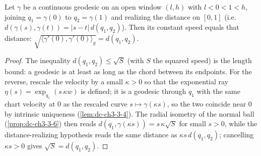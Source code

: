 \begin{lemma}
  \label{lem:dc-ch3-4-2-speed-dist}
  \leanok
  Let $\gamma$ be a continuous geodesic on an open window $(l,h)$ with $l<0<1<h$, joining
  $q_1=\gamma(0)$ to $q_2=\gamma(1)$ and realizing the distance on $[0,1]$
  (i.e. $d(\gamma(s),\gamma(t))=|s-t|\,d(q_1,q_2)$). Then its constant speed equals that distance:
  $\sqrt{\langle\gamma'(0),\gamma'(0)\rangle_g}=d(q_1,q_2)$.
\end{lemma}
\begin{proof}
  \sketch
  \leanok
  The inequality $d(q_1,q_2)\le\sqrt{S}$ (with $S$ the squared speed) is the length bound: a geodesic
  is at least as long as the chord between its endpoints. For the reverse, rescale the velocity by a
  small $\kappa>0$ so that the exponential ray $\eta(s)=\exp_{q_1}(s\,\kappa w)$ is defined; it is a
  geodesic through $q_1$ with the same chart velocity at $0$ as the rescaled curve
  $s\mapsto\gamma(\kappa s)$, so the two coincide near $0$ by intrinsic uniqueness
  (\cref{lem:dc-ch3-3-4}). The radial isometry of the normal ball (\cref{prop:dc-ch3-3-6}) then reads
  $d(q_1,\gamma(\kappa s))=s\,\kappa\sqrt{S}$ for small $s>0$, while the distance-realizing hypothesis
  reads the same distance as $\kappa s\,d(q_1,q_2)$; cancelling $\kappa s>0$ gives
  $\sqrt{S}=d(q_1,q_2)$.
\end{proof}

